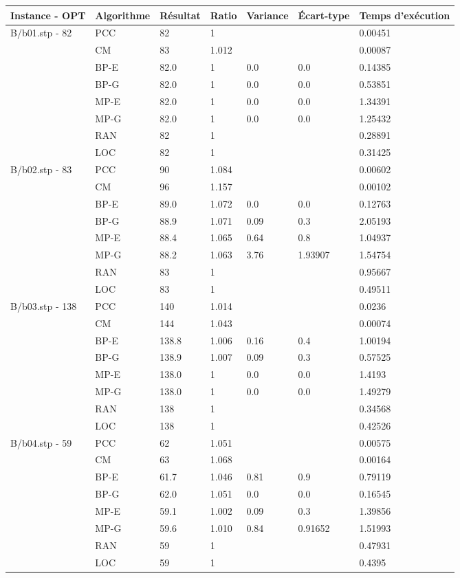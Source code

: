 \documentclass[12pt,a4paper]{article}
\begin{document}
\begin{center}
	\begin{tabular}{l|l|l|l|l|l|l}
		Instance - OPT & Algorithme & Résultat & Ratio & Variance & Écart-type & Temps d'exécution\\ \hline \hline
		B/b01.stp - 82&PCC&82&1&&&0.00451\\
		&CM&83&1.012&&&0.00087\\
		&BP-E&82.0&1&0.0&0.0&0.14385\\
		&BP-G&82.0&1&0.0&0.0&0.53851\\
		&MP-E&82.0&1&0.0&0.0&1.34391\\
		&MP-G&82.0&1&0.0&0.0&1.25432\\
		&RAN&82&1&&&0.28891\\
		&LOC&82&1&&&0.31425\\\hline
		B/b02.stp - 83&PCC&90&1.084&&&0.00602\\
		&CM&96&1.157&&&0.00102\\
		&BP-E&89.0&1.072&0.0&0.0&0.12763\\
		&BP-G&88.9&1.071&0.09&0.3&2.05193\\
		&MP-E&88.4&1.065&0.64&0.8&1.04937\\
		&MP-G&88.2&1.063&3.76&1.93907&1.54754\\
		&RAN&83&1&&&0.95667\\
		&LOC&83&1&&&0.49511\\\hline
		B/b03.stp - 138&PCC&140&1.014&&&0.0236\\
		&CM&144&1.043&&&0.00074\\
		&BP-E&138.8&1.006&0.16&0.4&1.00194\\
		&BP-G&138.9&1.007&0.09&0.3&0.57525\\
		&MP-E&138.0&1&0.0&0.0&1.4193\\
		&MP-G&138.0&1&0.0&0.0&1.49279\\
		&RAN&138&1&&&0.34568\\
		&LOC&138&1&&&0.42526\\\hline
		B/b04.stp - 59&PCC&62&1.051&&&0.00575\\
		&CM&63&1.068&&&0.00164\\
		&BP-E&61.7&1.046&0.81&0.9&0.79119\\
		&BP-G&62.0&1.051&0.0&0.0&0.16545\\
		&MP-E&59.1&1.002&0.09&0.3&1.39856\\
		&MP-G&59.6&1.010&0.84&0.91652&1.51993\\
		&RAN&59&1&&&0.47931\\
		&LOC&59&1&&&0.4395\\\hline
	\end{tabular}
\end{center}
		
\end{document}
